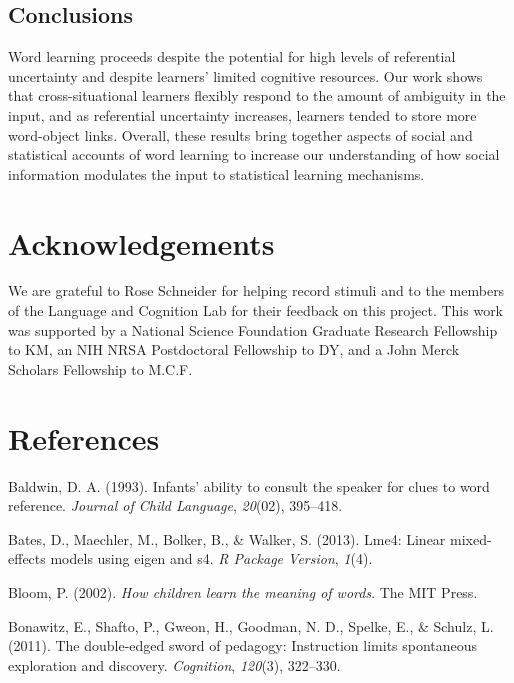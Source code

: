\documentclass[authoryear, review]{elsarticle}
\begin{document}
\subsection{Conclusions}\label{conclusions}

Word learning proceeds despite the potential for high levels of
referential uncertainty and despite learners' limited cognitive
resources. Our work shows that cross-situational learners flexibly
respond to the amount of ambiguity in the input, and as referential
uncertainty increases, learners tended to store more word-object links.
Overall, these results bring together aspects of social and statistical
accounts of word learning to increase our understanding of how social
information modulates the input to statistical learning mechanisms.

\newpage

\section{Acknowledgements}\label{acknowledgements}

We are grateful to Rose Schneider for helping record stimuli and to the
members of the Language and Cognition Lab for their feedback on this
project. This work was supported by a National Science Foundation
Graduate Research Fellowship to KM, an NIH NRSA Postdoctoral Fellowship
to DY, and a John Merck Scholars Fellowship to M.C.F.

\newpage

\section{References}\label{references}

\setlength{\parindent}{-0.1in} \setlength{\leftskip}{0.125in} \noindent

\hypertarget{refs}{}
\hypertarget{ref-baldwin1993infants}{}
Baldwin, D. A. (1993). Infants' ability to consult the speaker for clues
to word reference. \emph{Journal of Child Language}, \emph{20}(02),
395--418.

\hypertarget{ref-bates2013lme4}{}
Bates, D., Maechler, M., Bolker, B., \& Walker, S. (2013). Lme4: Linear
mixed-effects models using eigen and s4. \emph{R Package Version},
\emph{1}(4).

\hypertarget{ref-bloom2002children}{}
Bloom, P. (2002). \emph{How children learn the meaning of words}. The
MIT Press.

\hypertarget{ref-bonawitz2011double}{}
Bonawitz, E., Shafto, P., Gweon, H., Goodman, N. D., Spelke, E., \&
Schulz, L. (2011). The double-edged sword of pedagogy: Instruction
limits spontaneous exploration and discovery. \emph{Cognition},
\emph{120}(3), 322--330.
\end{document}
